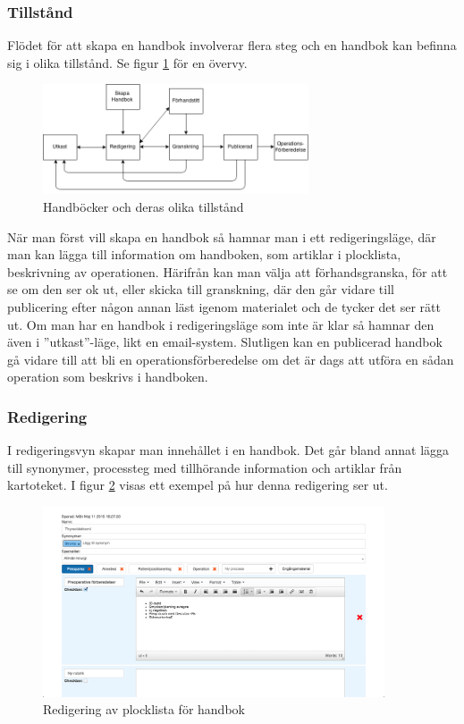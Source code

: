 \subsubsection{Tillstånd}
Flödet för att skapa en handbok involverar flera steg och en handbok kan befinna sig i olika tillstånd.
Se figur \ref{fig:model} för en övervy.

\begin{figure}[h!]
  \centering
  \includegraphics[width=0.7\textwidth]{images/model}
  \caption{Handböcker och deras olika tillstånd}
  \label{fig:model}
\end{figure}

När man först vill skapa en handbok så hamnar man i ett redigeringsläge,
där man kan lägga till information om handboken, som artiklar i plocklista,
beskrivning av operationen.
Härifrån kan man välja att förhandsgranska, för att se om den ser ok ut,
eller skicka till granskning, där den går vidare till publicering
efter någon annan läst igenom materialet och de tycker det ser rätt ut.
Om man har en handbok i redigeringsläge som inte är klar så hamnar den även i
''utkast''-läge, likt en email-system.
Slutligen kan en publicerad handbok gå vidare till att bli en
operationsförberedelse om det är dags att utföra en sådan operation
som beskrivs i handboken.

\subsubsection{Redigering}
I redigeringsvyn skapar man innehållet i en handbok. Det går bland annat lägga till synonymer, processteg med tillhörande information och artiklar från kartoteket. I figur \ref{fig:handboksredigering} visas ett exempel på hur denna redigering ser ut. 

\begin{figure}[h!]
  \centering
  \includegraphics[width=0.9\textwidth]{images/site/handboksredigering}
  \caption{Redigering av plocklista för handbok}
  \label{fig:handboksredigering}
\end{figure}


